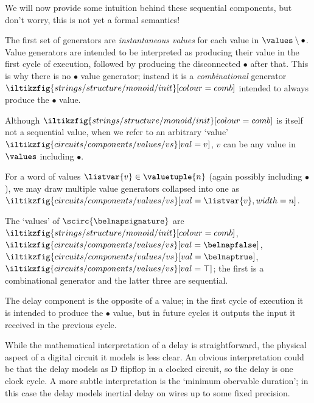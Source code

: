 \begin{remark}
    We will now provide some intuition behind these sequential components, but
    don't worry, this is not yet a formal semantics!
\end{remark}

The first set of generators are \emph{instantaneous values} for each value in
\(\values \setminus \bullet\).
Value generators are intended to be interpreted as producing their value in the
first cycle of execution, followed by producing the disconnected \(\bullet\)
after that.
This is why there is no \(\bullet\) value generator; instead it is a
\emph{combinational} generator \(
    \iltikzfig{strings/structure/monoid/init}[colour=comb]
\) intended to always produce the \(\bullet\) value.

\begin{notation}
    Although \(
        \iltikzfig{strings/structure/monoid/init}[colour=comb]
    \) is itself not a sequential value, when we refer to an arbitrary `value'
    \(
        \iltikzfig{circuits/components/values/vs}[val=v]
    \), \(v\) can be any value in \(\values\) including \(\bullet\).

    For a word of values \(\listvar{v} \in \valuetuple{n}\) (again possibly
    including \(\bullet\)), we may draw multiple value generators collapsed into
    one as \(
        \iltikzfig{circuits/components/values/vs}[val=\listvar{v},width=n]
    \).
\end{notation}

\begin{example}
    The `values' of \(\scirc{\belnapsignature}\) are \(
        \iltikzfig{strings/structure/monoid/init}[colour=comb]
    \), \(
        \iltikzfig{circuits/components/values/vs}[val=\belnapfalse]
    \), \(
        \iltikzfig{circuits/components/values/vs}[val=\belnaptrue]
    \), \(
        \iltikzfig{circuits/components/values/vs}[val=\top]
    \); the first is a combinational generator and the latter three are
    sequential.
\end{example}

The delay component is the opposite of a value; in the first cycle of execution
it is intended to produce the \(\bullet\) value, but in future cycles it outputs
the input it received in the previous cycle.

\begin{remark}
    While the mathematical interpretation of a delay is straightforward, the
    physical aspect of a digital circuit it models is less clear.
    An obvious interpretation could be that the delay models as D flipflop in
    a clocked circuit, so the delay is one clock cycle.
    A more subtle interpretation is the `minimum obervable duration'; in this
    case the delay models inertial delay on wires up to some fixed precision.
\end{remark}

